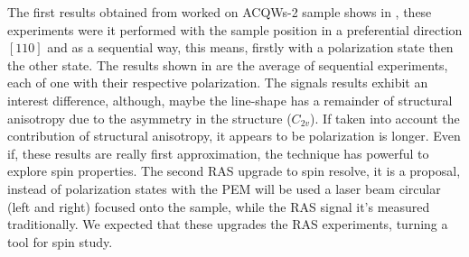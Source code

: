 The first results obtained from worked on ACQWs-2 sample shows in , these experiments were it performed with the sample position in a preferential direction $[110]$
and as a sequential way, this means, firstly with a polarization state then the other state.
The results shown in  are the average of sequential experiments, each of one with
their respective polarization. The signals results exhibit an interest difference, although,
maybe the line-shape has a remainder of structural anisotropy due to the asymmetry in
the structure ($C_{2v}$). If taken into account the contribution of structural anisotropy, it appears to be polarization is longer. Even if, these results are really first approximation, the technique has powerful to explore spin properties. The second RAS upgrade to spin resolve, it is a proposal, instead of polarization states with the PEM will be used a laser beam circular (left and right) focused onto the sample, while the RAS signal it’s measured traditionally. We expected that these upgrades the RAS experiments, turning a tool for spin study.




